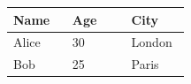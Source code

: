 \par\medskip
\begin{longtable}{|p{0.30\linewidth}|p{0.30\linewidth}|p{0.30\linewidth}|}
\hline
Name

 & Age

 & City

 \\
\hline
Alice

 & 30

 & London

 \\
\hline
Bob

 & 25

 & Paris

 \\
\hline
\end{longtable}
\medskip
